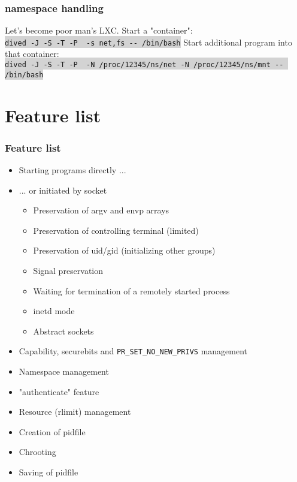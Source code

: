 \documentclass[aspectratio=43]{beamer}
\newcommand{\G}[1]{\colorbox{lightgray}{#1}}
\newcommand{\C}{\lstinline}
\begin{document}
\begin{frame}
    \frametitle{namespace handling}
    Let's become poor man's LXC.
    \pause \vfill
    Start a "container":\\
    \G{\C!dived -J -S -T -P  -s net,fs -- /bin/bash!}
    \pause \vfill
    Start additional program into that container:\\
    \G{\C!dived -J -S -T -P  -N /proc/12345/ns/net -N /proc/12345/ns/mnt -- /bin/bash!}
\end{frame}

\section{Feature list}

\begin{frame}
    \frametitle{Feature list}
    \begin{itemize}
        \item Starting programs directly ...
        \item ... or initiated by socket
        \hspace{20pt} \begin{itemize} 
            \item Preservation of argv and envp arrays
            \item Preservation of controlling terminal (limited)
            \item Preservation of uid/gid (initializing other groups)
            \item Signal preservation
            \item Waiting for termination of a remotely started process
            \item inetd mode
            \item Abstract sockets
        \end{itemize}
        \item Capability, securebits and \C!PR_SET_NO_NEW_PRIVS! management
        \item Namespace management
        \item "authenticate" feature
        \item Resource (rlimit) management
        \item Creation of pidfile
        \item Chrooting
        \item Saving of pidfile
    \end{itemize}
\end{frame}
\end{document}
